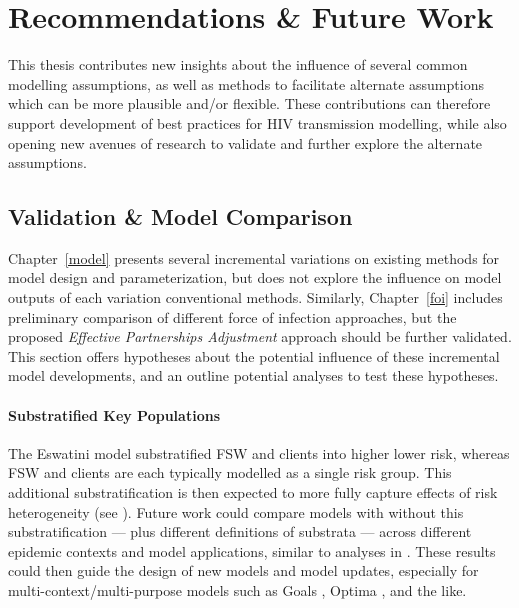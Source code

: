 \section{Recommendations \& Future Work}\label{conc.future}
This thesis contributes new insights about the influence of several common modelling assumptions,
as well as methods to facilitate alternate assumptions which can be more plausible and/or flexible.
These contributions can therefore support development of
best practices for HIV transmission modelling, while also
opening new avenues of research to validate and further explore the alternate assumptions.
\subsection{Validation \& Model Comparison}\label{conc.future.val}
Chapter~\ref{model} presents several
incremental variations on existing methods for model design and parameterization,
but does not explore the influence on model outputs of each variation \vs conventional methods.
Similarly, Chapter~\ref{foi} includes
preliminary comparison of different force of infection approaches,
but the proposed \emph{Effective Partnerships Adjustment} approach should be further validated.
This section offers hypotheses about
the potential influence of these incremental model developments,
and an outline potential analyses to test these hypotheses.
\paragraph{Substratified Key Populations}
The Eswatini model substratified FSW and clients into higher \vs lower risk,
whereas FSW and clients are each typically modelled as a single risk group.
This additional substratification is then expected to
more fully capture effects of risk heterogeneity (see ).
Future work could compare models with \vs without this substratification
--- plus different definitions of substrata ---
across different epidemic contexts and model applications,
similar to analyses in \cite{Hontelez2013,Bernard2017,Suen2017}.
These results could then guide the design of new models and model updates,
especially for multi-context/multi-purpose models such as
Goals \cite{Stover2014}, Optima \cite{Kerr2015}, and the like.

